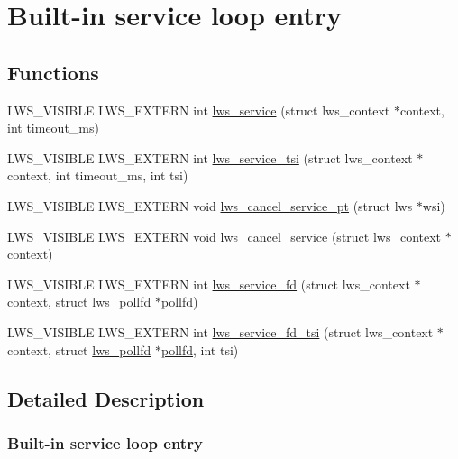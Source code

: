 \hypertarget{group__service}{}\section{Built-\/in service loop entry}
\label{group__service}
\subsection*{Functions}
\begin{DoxyCompactItemize}
\item 
L\+W\+S\+\_\+\+V\+I\+S\+I\+B\+LE L\+W\+S\+\_\+\+E\+X\+T\+E\+RN int \hyperlink{group__service_gaf95bd0c663d6516a0c80047d9b1167a8}{lws\+\_\+service} (struct lws\+\_\+context $\ast$context, int timeout\+\_\+ms)
\item 
L\+W\+S\+\_\+\+V\+I\+S\+I\+B\+LE L\+W\+S\+\_\+\+E\+X\+T\+E\+RN int \hyperlink{group__service_ga9b3cc4473fd8848e5bbee7f310712939}{lws\+\_\+service\+\_\+tsi} (struct lws\+\_\+context $\ast$context, int timeout\+\_\+ms, int tsi)
\item 
L\+W\+S\+\_\+\+V\+I\+S\+I\+B\+LE L\+W\+S\+\_\+\+E\+X\+T\+E\+RN void \hyperlink{group__service_ga29c246707997ab7a466aa709aecd2d7b}{lws\+\_\+cancel\+\_\+service\+\_\+pt} (struct lws $\ast$wsi)
\item 
L\+W\+S\+\_\+\+V\+I\+S\+I\+B\+LE L\+W\+S\+\_\+\+E\+X\+T\+E\+RN void \hyperlink{group__service_ga53e3d0801dfda7960a7249dd559e68a2}{lws\+\_\+cancel\+\_\+service} (struct lws\+\_\+context $\ast$context)
\item 
L\+W\+S\+\_\+\+V\+I\+S\+I\+B\+LE L\+W\+S\+\_\+\+E\+X\+T\+E\+RN int \hyperlink{group__service_gad82efa5466d14a9f05aa06416375b28d}{lws\+\_\+service\+\_\+fd} (struct lws\+\_\+context $\ast$context, struct \hyperlink{structlws__pollfd}{lws\+\_\+pollfd} $\ast$\hyperlink{structpollfd}{pollfd})
\item 
L\+W\+S\+\_\+\+V\+I\+S\+I\+B\+LE L\+W\+S\+\_\+\+E\+X\+T\+E\+RN int \hyperlink{group__service_gaebf426eda371ba23642fc11d8e0ace6b}{lws\+\_\+service\+\_\+fd\+\_\+tsi} (struct lws\+\_\+context $\ast$context, struct \hyperlink{structlws__pollfd}{lws\+\_\+pollfd} $\ast$\hyperlink{structpollfd}{pollfd}, int tsi)
\end{DoxyCompactItemize}


\subsection{Detailed Description}
\subsubsection*{Built-\/in service loop entry}

